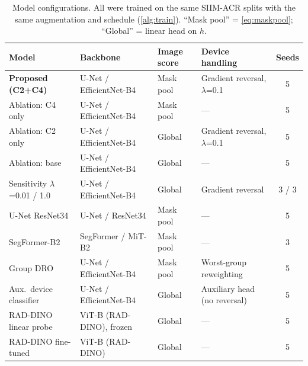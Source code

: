 \documentclass{ieeeaccess}
\begin{document}
\begin{table}[!t]
\centering\small
\caption{Model configurations. All were trained on the same SIIM-ACR splits with the same augmentation and schedule (\cref{alg:train}). ``Mask pool'' = \cref{eq:maskpool}; ``Global'' = linear head on $h$.}
\label{tab:models}
\begin{tabular}{@{}l l l l c@{}}
\toprule
Model & Backbone & Image score & Device handling & Seeds \\
\midrule
\textbf{Proposed (C2+C4)} & U-Net / EfficientNet-B4 & Mask pool & Gradient reversal, $\lambda$=0.1 & 5 \\
Ablation: C4 only & U-Net / EfficientNet-B4 & Mask pool & --- & 5 \\
Ablation: C2 only & U-Net / EfficientNet-B4 & Global & Gradient reversal, $\lambda$=0.1 & 5 \\
Ablation: base & U-Net / EfficientNet-B4 & Global & --- & 5 \\
Sensitivity $\lambda$=0.01 / 1.0 & U-Net / EfficientNet-B4 & Global & Gradient reversal & 3 / 3 \\
U-Net ResNet34 & U-Net / ResNet34 & Mask pool & --- & 5 \\
SegFormer-B2 & SegFormer / MiT-B2 & Mask pool & --- & 3 \\
Group DRO & U-Net / EfficientNet-B4 & Mask pool & Worst-group reweighting & 5 \\
Aux.\ device classifier & U-Net / EfficientNet-B4 & Global & Auxiliary head (no reversal) & 5 \\
RAD-DINO linear probe & ViT-B (RAD-DINO), frozen & Global & --- & 5 \\
RAD-DINO fine-tuned & ViT-B (RAD-DINO) & Global & --- & 5 \\
\bottomrule
\end{tabular}
\end{table}
\end{document}
